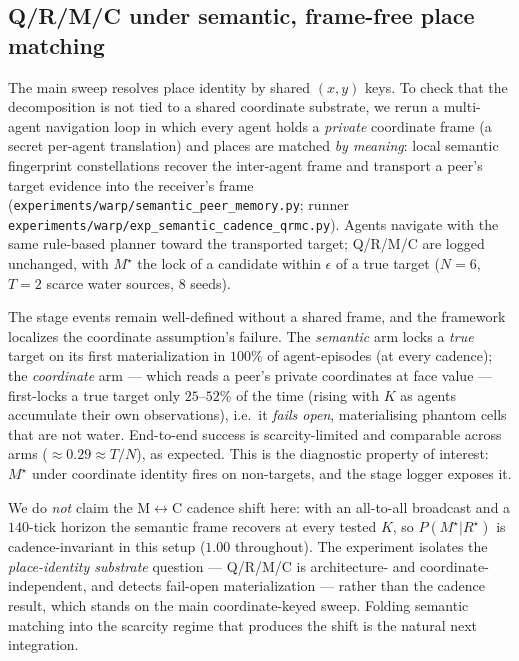 \documentclass{article}
\newcommand{\method}[1]{\texttt{#1}}
\begin{document}
\subsection{Q/R/M/C under semantic, frame-free place matching}
\label{p1:app:semantic-matching}

The main sweep resolves place identity by shared $(x,y)$ keys. To check that
the decomposition is not tied to a shared coordinate substrate, we rerun a
multi-agent navigation loop in which every agent holds a \emph{private}
coordinate frame (a secret per-agent translation) and places are matched
\emph{by meaning}: local semantic fingerprint constellations recover the
inter-agent frame and transport a peer's target evidence into the receiver's
frame (\method{experiments/warp/semantic\_peer\_memory.py}; runner
\method{experiments/warp/exp\_semantic\_cadence\_qrmc.py}). Agents navigate with
the same rule-based planner toward the transported target; Q/R/M/C are logged
unchanged, with $M^\star$ the lock of a candidate within $\epsilon$ of a true
target ($N{=}6$, $T{=}2$ scarce water sources, $8$ seeds).

The stage events remain well-defined without a shared frame, and the framework
localizes the coordinate assumption's failure. The \emph{semantic} arm locks a
\emph{true} target on its first materialization in $100\%$ of agent-episodes (at
every cadence); the \emph{coordinate} arm --- which reads a peer's private
coordinates at face value --- first-locks a true target only $25$--$52\%$ of the
time (rising with $K$ as agents accumulate their own observations), i.e.\ it
\emph{fails open}, materialising phantom cells that are not water. End-to-end
success is scarcity-limited and comparable across arms ($\approx0.29\!\approx\!T/N$),
as expected. This is the diagnostic property of interest: $M^\star$ under
coordinate identity fires on non-targets, and the stage logger exposes it.

We do \emph{not} claim the M$\leftrightarrow$C cadence shift here: with an
all-to-all broadcast and a $140$-tick horizon the semantic frame recovers at
every tested $K$, so $P(M^\star|R^\star)$ is cadence-invariant in this setup
($1.00$ throughout). The experiment isolates the \emph{place-identity substrate}
question --- Q/R/M/C is architecture- and coordinate-independent, and detects
fail-open materialization --- rather than the cadence result, which stands on
the main coordinate-keyed sweep. Folding semantic matching into the scarcity
regime that produces the shift is the natural next integration.
\end{document}
